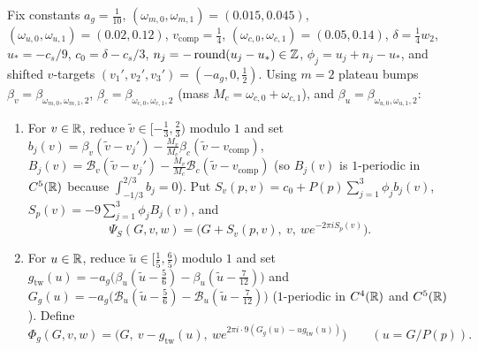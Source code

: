 \begin{construction}\label{cons:twists}
Fix constants $a_g=\frac1{10}$, $(\omega_{m,0},\omega_{m,1})=(0.015,0.045)$, $(\omega_{u,0},\omega_{u,1})=(0.02,0.12)$,
$v_{\mathrm{comp}}=\frac14$, $(\omega_{c,0},\omega_{c,1})=(0.05,0.14)$, $\delta=\frac14w_2$, $u_*=-c_s/9$,
$c_0=\delta-c_s/3$, $n_j=-\operatorname{round}(u_j-u_*)\in\mathbb{Z}$, $\phi_j=u_j+n_j-u_*$, and shifted $v$-targets
$(v_1',v_2',v_3')=(-a_g,0,\frac12)$. Using $m=2$ plateau bumps $\beta_v=\beta_{\omega_{m,0},\omega_{m,1},2}$,
$\beta_c=\beta_{\omega_{c,0},\omega_{c,1},2}$ (mass $M_c=\omega_{c,0}+\omega_{c,1}$), and
$\beta_u=\beta_{\omega_{u,0},\omega_{u,1},2}$:
\begin{enumerate}[label=(\arabic*)]
\item For $v\in\mathbb{R}$, reduce $\tilde v\in[-\frac13,\frac23)$ modulo $1$ and set
$b_j(v)=\beta_v(\tilde v-v_j')-\frac{M_v}{M_c}\beta_c(\tilde v-v_{\mathrm{comp}})$,
$B_j(v)=\mathcal B_v(\tilde v-v_j')-\frac{M_v}{M_c}\mathcal B_c(\tilde v-v_{\mathrm{comp}})$ (so $B_j(v)$ is
$1$-periodic in $C^5(\mathbb{R})$ because $\int_{-1/3}^{2/3}b_j=0$). Put
$S_v(p,v)=c_0+P(p)\sum_{j=1}^3\phi_j b_j(v)$, $S_p(v)=-9\sum_{j=1}^3\phi_j B_j(v)$, and
\[
 \Psi_S(G,v,w)=\bigl(G+S_v(p,v),\ v,\ we^{-2\pi i S_p(v)}\bigr).
\]
\item For $u\in\mathbb{R}$, reduce $\tilde u\in[\frac15,\frac65)$ modulo $1$ and set
$g_{\mathrm{tw}}(u)=-a_g\bigl(\beta_u(\tilde u-\frac56)-\beta_u(\tilde u-\frac7{12})\bigr)$ and
$G_g(u)=-a_g\bigl(\mathcal B_u(\tilde u-\frac56)-\mathcal B_u(\tilde u-\frac7{12})\bigr)$ ($1$-periodic in $C^4(\mathbb{R})$
and $C^5(\mathbb{R})$). Define
\[
 \Phi_g(G,v,w)=\bigl(G,\ v-g_{\mathrm{tw}}(u),\ we^{2\pi i\cdot9(G_g(u)-ug_{\mathrm{tw}}(u))}\bigr)\qquad(u=G/P(p)).
\]
\end{enumerate}
\end{construction}

